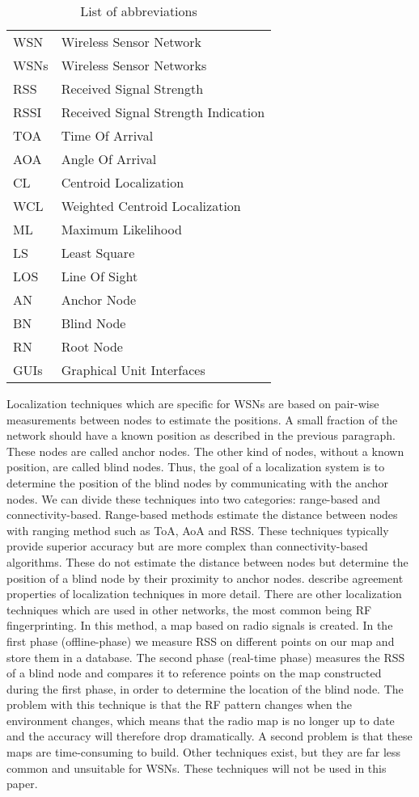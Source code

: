 \begin{table}[ht]
\caption{List of abbreviations}
\centering
\begin{tabular}{l l} \hline
	WSN 	& 	Wireless Sensor Network \\
	WSNs  &   Wireless Sensor Networks \\
	RSS 	& 	Received Signal Strength \\
	RSSI  &   Received Signal Strength Indication \\
	TOA   &		Time Of Arrival \\
	AOA   &   Angle Of Arrival \\
	CL 		& 	Centroid Localization \\
	WCL 	& 	Weighted Centroid Localization \\
	ML		&		Maximum Likelihood \\
	LS 		& 	Least Square \\
	LOS   &   Line Of Sight \\
	AN 		& 	Anchor Node \\
	BN 		& 	Blind Node \\
	RN    &   Root Node \\
	GUIs  &   Graphical Unit Interfaces \\ \hline
\end{tabular}
\end{table}

Localization techniques which are specific for WSNs are based on pair-wise measurements between nodes to estimate the positions. A small fraction of the network should have a known position as described in  the previous paragraph. These nodes are called anchor nodes. The other kind of nodes, without a known position, are called blind nodes. Thus, the goal of a localization system is to determine the position of the blind nodes by communicating with the anchor nodes. We can divide these techniques into two categories: range-based and connectivity-based. Range-based methods estimate the distance between nodes with ranging method such as ToA, AoA and RSS. These techniques typically provide superior accuracy but are more complex than connectivity-based  algorithms. These do not estimate the distance between nodes but determine the position of a blind node by their proximity to anchor nodes. \cite{hightower2001lsu}  describe agreement properties of localization techniques in more detail. 
There are other localization techniques which are used in other networks, the most common being RF fingerprinting. In this method, a map based on radio signals is created. In the first phase (offline-phase) we measure RSS on different points on our map and store them in a database. The second phase (real-time phase) measures the RSS of a blind node and compares it to reference points on the map constructed during the first phase, in order to determine the location of the blind node. The problem with this technique is that the RF pattern changes when the environment changes, which means that the radio map is no longer up to date and the accuracy will therefore drop dramatically. A second problem is that these maps are time-consuming to build. Other techniques exist, but they are far less common and unsuitable for WSNs.  These techniques will not be used in this paper. 

